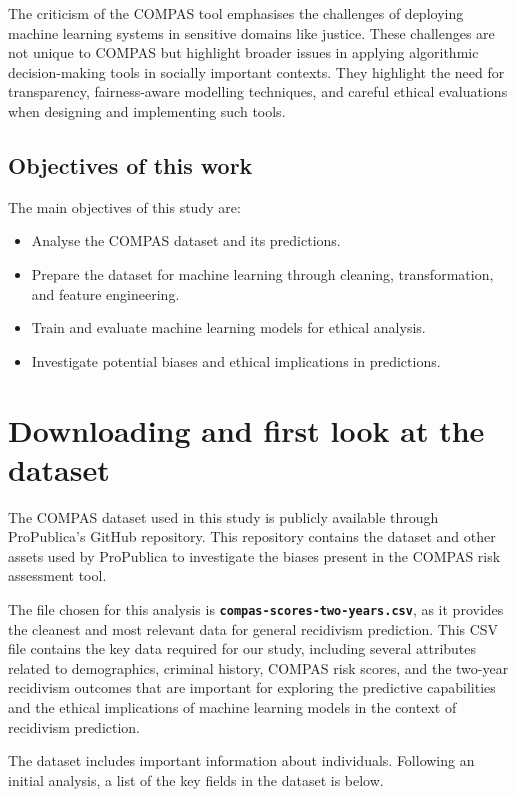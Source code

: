 \documentclass[conference]{IEEEtran}
\begin{document}
	
	The criticism of the COMPAS tool emphasises the challenges of deploying machine learning systems in sensitive domains like justice. These challenges are not unique to COMPAS but highlight broader issues in applying algorithmic decision-making tools in socially important contexts. They highlight the need for transparency, fairness-aware modelling techniques, and careful ethical evaluations when designing and implementing such tools.
	
	\subsection{Objectives of this work}
	
	The main objectives of this study are:
	
	\begin{itemize}[]
		\item Analyse the COMPAS dataset and its predictions.
		\item Prepare the dataset for machine learning through cleaning, transformation, and feature engineering.
		\item Train and evaluate machine learning models for ethical analysis.
		\item Investigate potential biases and ethical implications in predictions.
	\end{itemize}
	
	
	\section{Downloading and first look at the dataset}
	
	The COMPAS dataset used in this study is publicly available through ProPublica's GitHub repository. This repository contains the dataset and other assets used by ProPublica to investigate the biases present in the COMPAS risk assessment tool.
	
	The file chosen for this analysis is \textbf{\texttt{compas-scores-two-years.csv}}, as it provides the cleanest and most relevant data for general recidivism prediction. This CSV file contains the key data required for our study, including several attributes related to demographics, criminal history, COMPAS risk scores, and the two-year recidivism outcomes that are important for exploring the predictive capabilities and the ethical implications of machine learning models in the context of recidivism prediction. 
	
	The dataset includes important information about individuals. Following an initial analysis, a list of the key fields in the dataset is below.
	
\end{document}
